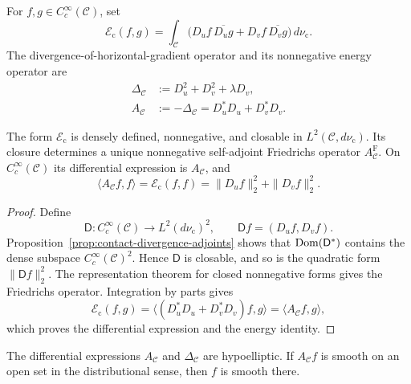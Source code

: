 \begin{definition}
\label{def:contact-variational-sublaplacian}
For $f,g\in C_c^\infty(\mathcal C)$, set
\begin{equation}\label{eq:contact-dirichlet-form}
 \mathcal E_{\mathrm c}(f,g)
 =\int_{\mathcal C}
 \bigl(D_uf\,\overline{D_ug}+D_vf\,\overline{D_vg}\bigr)\,d\nu_{\mathrm c}.
\end{equation}
The divergence-of-horizontal-gradient operator and its nonnegative energy operator
are
\begin{align}
 \Delta_{\mathcal C}
   &:=D_u^2+D_v^2+\lambda D_v,\label{eq:contact-variational-laplacian}\\
 A_{\mathcal C}
   &:=-\Delta_{\mathcal C}
     =D_u^*D_u+D_v^*D_v.\label{eq:contact-energy-operator}
\end{align}
\end{definition}

\begin{proposition}
\label{prop:contact-friedrichs-realization}
The form $\mathcal E_{\mathrm c}$ is densely defined, nonnegative, and closable in
$L^2(\mathcal C,d\nu_{\mathrm c})$.  Its closure determines a unique nonnegative
self-adjoint Friedrichs operator $A_{\mathcal C}^{\mathrm F}$.  On
$C_c^\infty(\mathcal C)$ its differential expression is $A_{\mathcal C}$, and
\begin{equation}\label{eq:contact-energy-identity}
 \langle A_{\mathcal C}f,f\rangle
 =\mathcal E_{\mathrm c}(f,f)
 =\|D_uf\|_2^2+\|D_vf\|_2^2.
\end{equation}
\end{proposition}

\begin{proof}
Define
\[
 \mathsf D:C_c^\infty(\mathcal C)\longrightarrow L^2(d\nu_{\mathrm c})^2,
 \qquad \mathsf Df=(D_uf,D_vf).
\]
Proposition~\ref{prop:contact-divergence-adjoints} shows that
$\operatorname{Dom}(\mathsf D^*)$ contains the dense subspace
$C_c^\infty(\mathcal C)^2$.  Hence $\mathsf D$ is closable, and so is the
quadratic form $\|\mathsf Df\|_2^2$.  The representation theorem for closed
nonnegative forms gives the Friedrichs operator.  Integration by parts gives
\[
 \mathcal E_{\mathrm c}(f,g)
 =\langle(D_u^*D_u+D_v^*D_v)f,g\rangle
 =\langle A_{\mathcal C}f,g\rangle,
\]
which proves the differential expression and the energy identity.
\end{proof}

\begin{theorem}
\label{thm:contact-hormander-hypoellipticity}
The differential expressions $A_{\mathcal C}$ and
$\Delta_{\mathcal C}$ are hypoelliptic.  If $A_{\mathcal C}f$ is smooth on
an open set in the distributional sense, then $f$ is smooth there.
\end{theorem}

